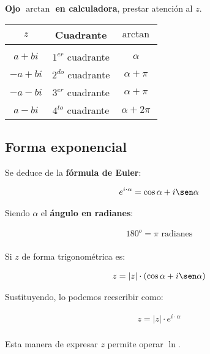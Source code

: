 \documentclass[12pt]{article}
\begin{document}
\textbf{Ojo \(\arctan\) en calculadora},
prestar atención al \(z\).

\begin{center}
    \begin{tabular}{ c c c }
        \(z\)       & Cuadrante            & \(\arctan\)         \\
        \hline                                                   \\
        \(a + bi\)  & \(1^{er}\) cuadrante & \( \alpha \)        \\
        \(-a + bi\) & \(2^{do}\) cuadrante & \( \alpha + \pi \)  \\
        \(-a - bi\) & \(3^{er}\) cuadrante & \( \alpha + \pi \)  \\
        \(a - bi\)  & \(4^{to}\) cuadrante & \( \alpha + 2\pi \) \\
    \end{tabular}
\end{center}

\subsection{Forma exponencial}

Se deduce de la \textbf{fórmula de Euler}:

\begin{align*}
    e^{i \cdot \alpha} = \cos\alpha + i \sen\alpha \\
\end{align*}

Siendo \(\alpha\) el \textbf{ángulo en radianes}:

\begin{align*}
    180^o = \pi\text{ radianes} \\
\end{align*}

Si \(z\) de forma trigonométrica es:

\begin{align*}
    z = |z| \cdot (\cos\alpha + i\sen\alpha) \\
\end{align*}

Sustituyendo, lo podemos reescribir como:

\begin{align*}
    z = |z| \cdot e^{i \cdot \alpha} \\
\end{align*}

Esta manera de expresar \(z\) permite operar \(\ln\).
\end{document}
